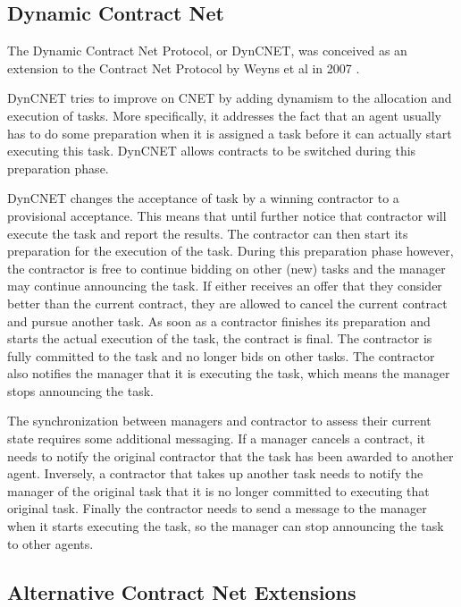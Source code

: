 \documentclass[10pt,a4paper]{article}
\makeatletter
\newcommand{\taskV}[1]{\todo[inline, color=red]{@Victor, fix: #1}}
\makeatother
\begin{document}
\subsection{Dynamic Contract Net}
The Dynamic Contract Net Protocol, or DynCNET, was conceived as an extension to the Contract Net Protocol by Weyns et al in 2007 \cite{DynCNET}. 

DynCNET tries to improve on CNET by adding dynamism to the allocation and execution of tasks. More specifically, it addresses the fact that an agent usually has to do some preparation when it is assigned a task before it can actually start executing this task. DynCNET allows contracts to be switched during this preparation phase.

DynCNET changes the acceptance of task by a winning contractor to a provisional acceptance. This means that until further notice that contractor will execute the task and report the results. The contractor can then start its preparation for the execution of the task. During this preparation phase however, the contractor is free to continue bidding on other (new) tasks and the manager may continue announcing the task. If either receives an offer that they consider better than the current contract, they are allowed to cancel the current contract and pursue another task. As soon as a contractor finishes its preparation and starts the actual execution of the task, the contract is final. The contractor is fully committed to the task and no longer bids on other tasks. The contractor also notifies the manager that it is executing the task, which means the manager stops announcing the task.

The synchronization between managers and contractor to assess their current state requires some additional messaging. If a manager cancels a contract, it needs to notify the original contractor that the task has been awarded to another agent. Inversely, a contractor that takes up another task needs to notify the manager of the original task that it is no longer committed to executing that original task. Finally the contractor needs to send a message to the manager when it starts executing the task, so the manager can stop announcing the task to other agents.

\subsection{Alternative Contract Net Extensions}
\taskV{nalezen}
\end{document}
